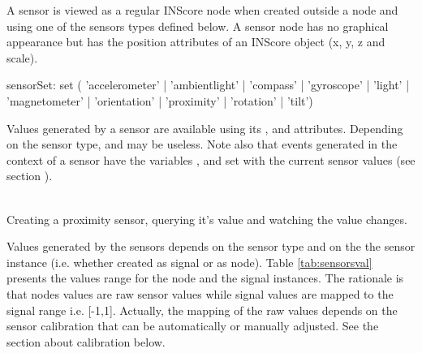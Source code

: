 A sensor is viewed as a regular INScore node when created outside a  node and using one of the sensors types defined below. A sensor node has no graphical appearance but has the position attributes of an INScore object (x, y, z and scale). 


\begin{rail}
sensorSet: 	 set (
		  'accelerometer'
		| 'ambientlight'
		| 'compass'	
		| 'gyroscope'
		| 'light'	
		| 'magnetometer'
		| 'orientation'
		| 'proximity'
		| 'rotation'
		| 'tilt')
\end{rail}

Values generated by a sensor are available using its ,  and  attributes. Depending on the sensor type,  and  may be useless. Note also that events generated in the context of a sensor have the variables ,  and  set with the current sensor values (see section ). 

\example \\
Creating a proximity sensor, querying it's value and watching the value changes.


\label{sensorValues}

Values generated by the sensors depends on the sensor type and on the the sensor instance (i.e. whether created as signal or as node). Table \ref{tab:sensorsval} presents the values range for the node and the signal instances.
The rationale is that nodes values are raw sensor values while signal values are mapped to the signal range i.e. [-1,1]. 
Actually, the mapping of the raw values depends on the sensor calibration that can be automatically or manually adjusted. See the section about calibration below.

\label{tab:sensorsval}

